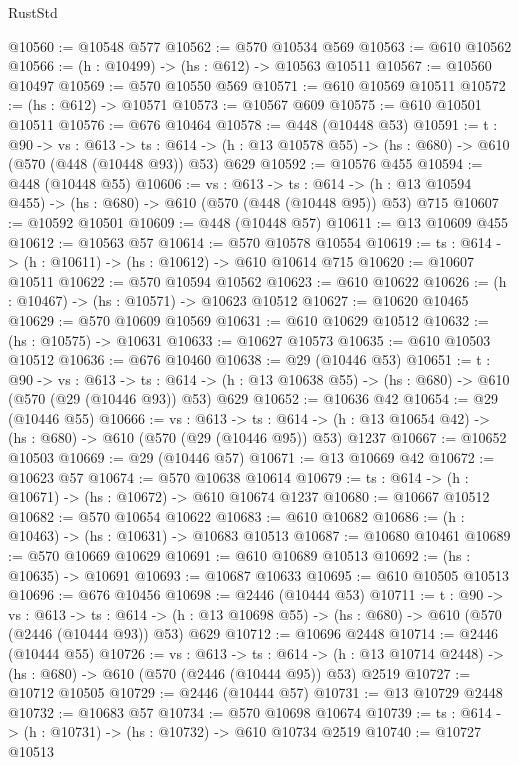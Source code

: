 \begin{lexlean}{RustStd}
\begin{coremodule}
@10560 := @10548 @577
@10562 := @570 @10534 @569
@10563 := @610 @10562
@10566 := (h : @10499) -> (hs : @612) -> @10563 @10511
@10567 := @10560 @10497
@10569 := @570 @10550 @569
@10571 := @610 @10569 @10511
@10572 := (hs : @612) -> @10571
@10573 := @10567 @609
@10575 := @610 @10501 @10511
@10576 := @676 @10464
@10578 := @448 (@10448 @53)
@10591 := {t : @90} ->
  {vs : @613} ->
  {ts : @614} -> (h : @13 @10578 @55) -> (hs : @680) -> @610 (@570 (@448 (@10448 @93)) @53) @629
@10592 := @10576 @455
@10594 := @448 (@10448 @55)
@10606 := {vs : @613} ->
  {ts : @614} -> (h : @13 @10594 @455) -> (hs : @680) -> @610 (@570 (@448 (@10448 @95)) @53) @715
@10607 := @10592 @10501
@10609 := @448 (@10448 @57)
@10611 := @13 @10609 @455
@10612 := @10563 @57
@10614 := @570 @10578 @10554
@10619 := {ts : @614} -> (h : @10611) -> (hs : @10612) -> @610 @10614 @715
@10620 := @10607 @10511
@10622 := @570 @10594 @10562
@10623 := @610 @10622
@10626 := (h : @10467) -> (hs : @10571) -> @10623 @10512
@10627 := @10620 @10465
@10629 := @570 @10609 @10569
@10631 := @610 @10629 @10512
@10632 := (hs : @10575) -> @10631
@10633 := @10627 @10573
@10635 := @610 @10503 @10512
@10636 := @676 @10460
@10638 := @29 (@10446 @53)
@10651 := {t : @90} ->
  {vs : @613} ->
  {ts : @614} -> (h : @13 @10638 @55) -> (hs : @680) -> @610 (@570 (@29 (@10446 @93)) @53) @629
@10652 := @10636 @42
@10654 := @29 (@10446 @55)
@10666 := {vs : @613} ->
  {ts : @614} -> (h : @13 @10654 @42) -> (hs : @680) -> @610 (@570 (@29 (@10446 @95)) @53) @1237
@10667 := @10652 @10503
@10669 := @29 (@10446 @57)
@10671 := @13 @10669 @42
@10672 := @10623 @57
@10674 := @570 @10638 @10614
@10679 := {ts : @614} -> (h : @10671) -> (hs : @10672) -> @610 @10674 @1237
@10680 := @10667 @10512
@10682 := @570 @10654 @10622
@10683 := @610 @10682
@10686 := (h : @10463) -> (hs : @10631) -> @10683 @10513
@10687 := @10680 @10461
@10689 := @570 @10669 @10629
@10691 := @610 @10689 @10513
@10692 := (hs : @10635) -> @10691
@10693 := @10687 @10633
@10695 := @610 @10505 @10513
@10696 := @676 @10456
@10698 := @2446 (@10444 @53)
@10711 := {t : @90} ->
  {vs : @613} ->
  {ts : @614} -> (h : @13 @10698 @55) -> (hs : @680) -> @610 (@570 (@2446 (@10444 @93)) @53) @629
@10712 := @10696 @2448
@10714 := @2446 (@10444 @55)
@10726 := {vs : @613} ->
  {ts : @614} -> (h : @13 @10714 @2448) -> (hs : @680) -> @610 (@570 (@2446 (@10444 @95)) @53) @2519
@10727 := @10712 @10505
@10729 := @2446 (@10444 @57)
@10731 := @13 @10729 @2448
@10732 := @10683 @57
@10734 := @570 @10698 @10674
@10739 := {ts : @614} -> (h : @10731) -> (hs : @10732) -> @610 @10734 @2519
@10740 := @10727 @10513

\end{coremodule}
\end{lexlean}
